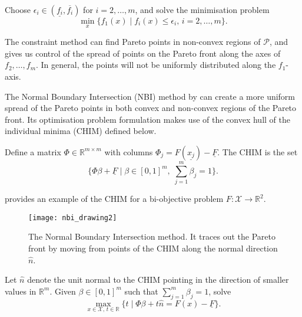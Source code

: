 \documentclass[main.tex]{subfiles}
\begin{document}
\begin{mydef}
  Choose
  $\epsilon_i\in(\underline{f_i},\overline{f_i})$ for $i=2,\dots,m$, and
  solve the minimisation problem
  \begin{equation}\label{eq:pareto_constraint_method}
    \min_x\{f_1(x)\mid f_i(x)\leq \epsilon_i,\, i=2,\dots,m\}.
  \end{equation}
\end{mydef}
The constraint method can find Pareto points in non-convex regions of
$\mathcal{P}$, and gives us control of the spread of points on the Pareto front
along the axes of $f_2,\dots,f_m$. In general, the points will not be
uniformly distributed along the $f_1$-axis.

The Normal Boundary Intersection (NBI) method by \citet{das1998normal} can
create a more uniform spread of the Pareto points in both convex and
non-convex regions of the Pareto front. Its optimisation problem
formulation makes use of the convex hull of the individual minima
(CHIM) defined below.
\begin{mydef}
  Define a matrix $\Phi\in\mathbb{R}^{m\times m}$ with columns
  $\Phi_j = F(\underline{x_j})-\underline{F}$.
  The CHIM is the set
  \begin{equation}\textstyle
    \{\Phi\beta + \underline{F} \mid \beta\in{[0,1]}^m,\;\sum_{j=1}^m\beta_j = 1\}.
  \end{equation}
\end{mydef}

\begin{example}
   provides an example of the CHIM for a
  bi-objective problem $F:\mathcal{X}\to\mathbb{R}^2$.
  \begin{figure}[htbp]
    \centering
    \texttt{[image: nbi\_drawing2]}
    \caption[The Normal Boundary Intersection method]{The Normal Boundary Intersection method. It traces out the
      Pareto front by moving from points of the CHIM along the normal
      direction $\hat n$.}\label{fig:nbi_drawing2}
  \end{figure}
\end{example}

\begin{mydef}
  Let $\hat{n}$ denote the unit normal to the CHIM pointing in the
  direction of smaller values in $\mathbb{R}^m$.
  Given $\beta\in{[0,1]}^m$ such that
  $\sum_{j=1}^m\beta_j=1$, solve
  \begin{equation}
    \max_{x\in\mathcal{X},\,t\in\mathbb{R}} \{t \mid \Phi\beta +
    t\hat{n} = F(x) - \underline{F}\}.
  \end{equation}
\end{mydef}
\end{document}
